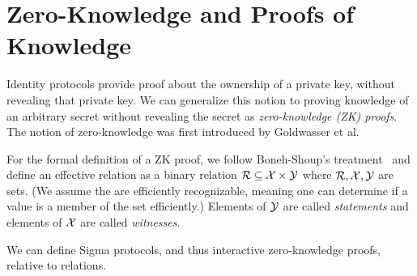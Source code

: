 \section{Zero-Knowledge and Proofs of Knowledge}
\label{sec:zknowledge}
Identity protocols provide proof about the ownership of a private key, without revealing that private key.
We can generalize this notion to proving knowledge of an arbitrary secret without revealing the secret as \emph{zero-knowledge (ZK) proofs}. 
The notion of zero-knowledge was first introduced by Goldwasser et al.~\cite{goldwasser1989knowledge}

For the formal definition of a ZK proof, we follow Boneh-Shoup's treatment~\cite{BonehShoupBook} and define an effective relation as a binary relation ${\cal R} \subseteq {\cal X} \times {\cal Y}$  where ${\cal R}, {\cal X},{\cal Y}$ are sets.
(We assume the are efficiently recognizable, meaning one can determine if a value is a member of the set efficiently.)
Elements of ${\cal Y}$ are called \emph{statements} and elements of ${\cal X}$ are called \emph{witnesses}.

We can define Sigma protocols, and thus interactive zero-knowledge proofs, relative to relations.

\begin{figure}[h]
\centering

\end{figure}

